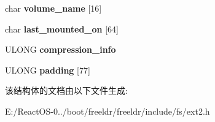 \begin{DoxyCompactItemize}
\mbox{\label{structext2__sblock_a6a4b569af68551f085c88b08e59fed12}} 
char {\bfseries volume\+\_\+name} \mbox{[}16\mbox{]}
\item 
\mbox{\label{structext2__sblock_a280db2de0e591f1da23adc775493dea1}} 
char {\bfseries last\+\_\+mounted\+\_\+on} \mbox{[}64\mbox{]}
\item 
\mbox{\label{structext2__sblock_a3357da940605c01c990982880b74296b}} 
U\+L\+O\+NG {\bfseries compression\+\_\+info}
\item 
\mbox{\label{structext2__sblock_a7f435197943fea4b554c348b569e7358}} 
U\+L\+O\+NG {\bfseries padding} \mbox{[}77\mbox{]}
\end{DoxyCompactItemize}


该结构体的文档由以下文件生成\+:\begin{DoxyCompactItemize}
\item 
E\+:/\+React\+O\+S-\/0../boot/freeldr/freeldr/include/fs/ext2.\+h\end{DoxyCompactItemize}
